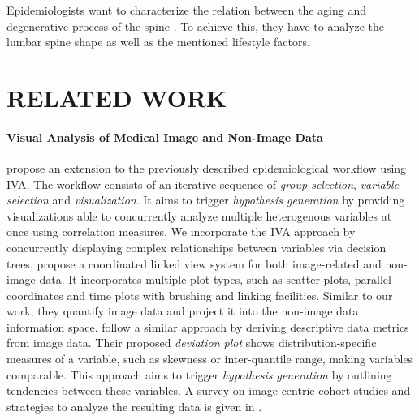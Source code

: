 \documentclass[a4paper,twoside]{style/article}
\begin{document}
Epidemiologists want to characterize the relation between the aging and degenerative process of the spine \cite{Szpalski2005}.
To achieve this, they have to analyze the lumbar spine shape as well as the mentioned lifestyle factors.
\section{\uppercase{Related Work}}
\label{sec:RelatedWork}
\paragraph{Visual Analysis of Medical Image and Non-Image Data}
\cite{Klemm2014VIS} propose an extension to the previously described epidemiological workflow using IVA.
The workflow consists of an iterative sequence of \emph{group selection}, \emph{variable selection} and \emph{visualization}.
It aims to trigger \emph{hypothesis generation} by providing visualizations able to concurrently analyze multiple heterogenous variables at once using correlation measures.
We incorporate the IVA approach by concurrently displaying complex relationships between variables via decision trees.
\cite{Steenwijk} propose a coordinated linked view system for both image-related and non-image data.
It incorporates multiple plot types, such as scatter plots, parallel coordinates and time plots with brushing and linking facilities.
Similar to our work, they quantify image data and project it into the non-image data information space.
\cite{Turkay} follow a similar approach by deriving descriptive data metrics from image data.
Their proposed \emph{deviation plot} shows distribution-specific measures of a variable, such as skewness or inter-quantile range, making variables comparable.
This approach aims to trigger \emph{hypothesis generation} by outlining tendencies between these variables.
A survey on image-centric cohort studies and strategies to analyze the resulting data is given in \cite{Preim2014}.
\end{document}
